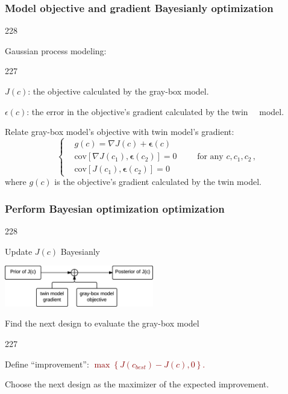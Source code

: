 \documentclass{beamer}
\let\oldcite=\cite
\renewcommand{\cite}[1]{\textcolor[rgb]{.4,.4,.85}{\oldcite{#1}}}
\newcommand{\barrow}{\item[\color{darkred}\ding{228}]}
\newcommand{\carrow}{\item[\color{darkred}\ding{227}]}
\begin{document}
\begin{frame}
    \frametitle{Model objective and gradient Bayesianly \hfill \scriptsize{optimization}}\small
    \begin{dinglist}{228}
        \barrow Gaussian process modeling:
        \begin{dinglist}{227}
            \carrow $J(c)$: the objective calculated by the gray-box model.\vspace{.15cm}
            \carrow $\epsilon(c)$: the error in the objective's gradient calculated by the twin $\quad$model.
        \end{dinglist}
        \small
        \vspace{.2cm}
        \barrow Relate gray-box model's objective with twin model's gradient:
        \begin{equation*}\left\{\begin{split}
            &g(c) = \nabla J(c) + \mathbf{\epsilon}(c)\\
            &\textrm{cov} \left[\nabla J(c_1), \mathbf{\epsilon}(c_2) \right] = 0\\
            &\textrm{cov} \left[J(c_1), \mathbf{\epsilon}(c_2) \right] = 0
        \end{split} \right.\qquad \textrm{for any } c, c_1, c_2\,,\end{equation*}
        where $g(c)$ is the objective's gradient calculated by the twin model.
    \end{dinglist}
\end{frame}

\begin{frame}
    \frametitle{Perform Bayesian optimization \hfill \scriptsize{optimization}}\small
    \begin{dinglist}{228}
        \barrow Update $J(c)$ Bayesianly\\
        \begin{center}
            \includegraphics[width=6.5cm]{prior_posterior}
        \end{center}
        \barrow Find the next design to evaluate the gray-box model \scriptsize{\cite{Snoek 12}}
        \small\vspace{.15cm}
        \begin{dinglist}{227}
            \carrow Define ``improvement'': \textcolor{darkred}{$\max\left\{J(c_{best})-J(c), 0\right\}$.}\vspace{.15cm}
            \carrow Choose the next design as the maximizer of the expected improvement.
        \end{dinglist}
    \end{dinglist}
\end{frame}
\end{document}
